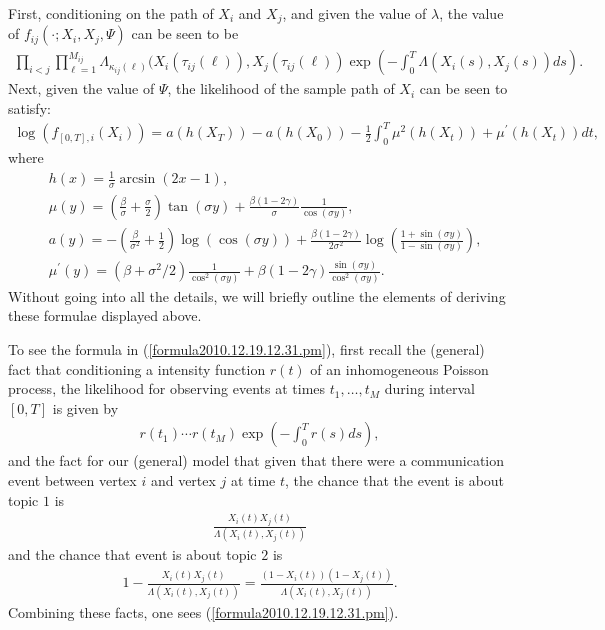 \documentclass[12pt]{article}%
\begin{document}
First, conditioning on the path of $X_i$ and $X_j$, and given the value of $\lambda$,   
the value of $f_{ij}(\cdot;X_i,X_j,\Psi)$ can be seen to be
\begin{eqnarray}\label{formula2010.12.19.12.31.pm}
\prod_{i<j} \prod_{\ell=1}^{M_{ij}} \Lambda_{\kappa_{ij}(\ell)}(X_i(\tau_{ij}(\ell)),X_j(\tau_{ij}(\ell)) \exp\left(-\int_0^T \Lambda(X_i(s),X_j(s)) ds\right).
\end{eqnarray}
Next, given the value of $\Psi$, the likelihood of the sample path of $X_i$ can be 
seen to satisfy:
\begin{eqnarray}\label{formula2010.12.19.01.07.pm}
\log(f_{[0,T],i}(X_i)) 
=
a(h(X_T)) - a(h(X_0)) 
-\frac{1}{2} \int_0^T \mu^2(h(X_t)) +\mu^\prime(h(X_t)) dt,
\end{eqnarray}
where 
\begin{eqnarray}
&h(x) = \frac{1}{\sigma} \arcsin(2x - 1),\\
&\mu(y) = \left(\frac{\beta}{\sigma} + \frac{\sigma}{2}\right) \tan(\sigma y)
+\frac{\beta(1-2\gamma)}{\sigma} \frac{1}{\cos(\sigma y)},\\
&a(y) = - \left(\frac{\beta}{\sigma^2}+\frac{1}{2}\right) \log(\cos(\sigma y))
+ \frac{\beta (1-2\gamma)}{2\sigma^2} \log\left(\frac{1+\sin(\sigma y)}{1-\sin(\sigma y)}\right),\\
&\mu^\prime(y) = 
(\beta+ \sigma^2/2) \frac{1}{\cos^2(\sigma y)} + \beta (1-2\gamma) \frac{\sin(\sigma y)}{\cos^2(\sigma y)}. 
\end{eqnarray}
Without going into all the details, we will briefly outline the elements of 
deriving these formulae displayed above.  


To see the formula in (\ref{formula2010.12.19.12.31.pm}), first recall the (general) fact that 
conditioning a intensity function $r(t)$ of an inhomogeneous Poisson process,
the likelihood for observing events at times $t_1,\ldots, t_M$ during interval $[0,T]$
is given by
\begin{eqnarray}
r(t_1)\cdots r(t_M) \exp\left(-\int_0^{T} r(s) ds\right),
\end{eqnarray}
and the fact for our (general) model that 
given that there were a communication event between vertex $i$ and vertex $j$ at time $t$,
the chance that the event is about topic $1$ is 
\begin{eqnarray}
\frac{X_i(t)X_j(t)}{\Lambda(X_i(t),X_j(t))} 
\end{eqnarray}
and the chance that event is about topic $2$ is 
\begin{eqnarray}
1-\frac{X_i(t)X_j(t)}{\Lambda(X_i(t),X_j(t))} 
=
\frac{(1-X_i(t))(1-X_j(t))}{\Lambda(X_i(t),X_j(t))}.
\end{eqnarray}
Combining these facts, one sees (\ref{formula2010.12.19.12.31.pm}). 
\end{document}
